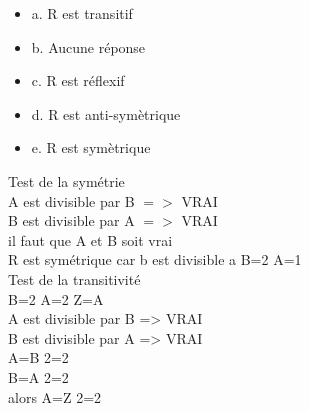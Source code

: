 \begin{itemize}[label=$\square$]
\item {a. R est transitif}
\item {b. Aucune réponse}
\item {c. R est réflexif}
\item {d. R est anti-symètrique}
\item {e. R est symètrique}
\end{itemize}

Test de la symétrie \\

A est divisible par B $=>$ VRAI \\
B est divisible par A $=>$ VRAI \\
il faut que A et B soit vrai \\

R est symétrique car b est divisible a B=2 A=1 \\

Test de la transitivité \\

B=2 A=2 Z=A \\
A est divisible par B => VRAI \\
B est divisible par A => VRAI \\

A=B 2=2 \\
B=A 2=2 \\
alors A=Z 2=2 \\
